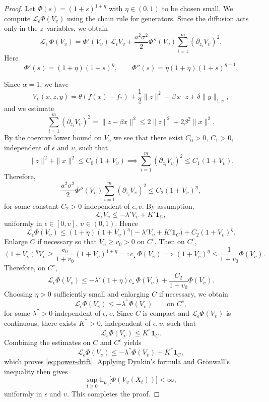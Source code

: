 \documentclass[10pt,a4paper]{amsart}
\begin{document}
\begin{proof}
Let $\Phi(s)=(1+s)^{1+\eta}$ with $\eta\in(0,1)$ to be chosen small.
We compute ${\mathcal L}_\epsilon\Phi(V_\upsilon)$ using the chain rule for generators.
Since the diffusion acts only in the $z$–variables, we obtain
\[
{\mathcal L}_\epsilon\,\Phi(V_\upsilon)
=\Phi'(V_\upsilon)\,{\mathcal L}_\epsilon V_\upsilon
+\frac{a^2\sigma^2}{2}\Phi''(V_\upsilon)
\sum_{i=1}^m(\partial_{z_i}V_\upsilon)^2 .
\]
Here
\[
\Phi'(s)=(1+\eta)(1+s)^{\eta},
\qquad
\Phi''(s)=\eta(1+\eta)(1+s)^{\eta-1}.
\]

\medskip

\noindent
Since $\alpha=1$, we have
\[
V_\upsilon(x,z,y)
= \theta(f(x)-f_\ast)
+ \frac12\|z\|^2
- \beta\, x\cdot z
+ \delta\|y\|_{1,\upsilon},
\]
and we estimate
\[
\sum_{i=1}^m(\partial_{z_i}V_\upsilon)^2
= \|z-\beta x\|^2
\le 2\|z\|^2 + 2\beta^2\|x\|^2.
\]
By the coercive lower bound on $V_\upsilon$ we see that there exist $C_0>0$, $C_1>0$, independent of $\epsilon$ and $\upsilon$,
such that
\[
\|z\|^2+\|x\|^2
\le C_0(1+V_\upsilon)\implies
\sum_{i=1}^m(\partial_{z_i}V_\upsilon)^2
\le C_1(1+V_\upsilon).
\]
Therefore,
\[
\frac{a^2\sigma^2}{2}\Phi''(V_\upsilon)
\sum_{i=1}^m(\partial_{z_i}V_\upsilon)^2
\le C_2(1+V_\upsilon)^{\eta},
\]
for some constant $C_2>0$ independent of $\epsilon,\upsilon$. By assumption,
\[
{\mathcal L}_\epsilon V_\upsilon
\le -\lambda' V_\upsilon + K'\mathbf 1_{C},
\]
uniformly in $\epsilon\in[0,\upsilon]$, $\upsilon\in(0,1)$.
Hence
\[
{\mathcal L}_\epsilon\Phi(V_\upsilon)
\le (1+\eta)(1+V_\upsilon)^{\eta}
\bigl(-\lambda' V_\upsilon + K'\mathbf 1_{C}\bigr)
+ C_2(1+V_\upsilon)^{\eta}.
\]
Enlarge $C$ if necessary so that $V_\upsilon\ge v_0>0$ on $C^c$.
Then on $C^c$,
\[
(1+V_\upsilon)^{\eta}V_\upsilon
\ge \frac{v_0}{1+v_0}(1+V_\upsilon)^{1+\eta}
=: c_\star\,\Phi(V_\upsilon)\implies
(1+V_\upsilon)^{\eta}
\le \frac{1}{1+v_0}\Phi(V_\upsilon).
\]
Therefore, on $C^c$,
\[
{\mathcal L}_\epsilon\Phi(V_\upsilon)
\le -\lambda'(1+\eta)c_\star\,\Phi(V_\upsilon)
+ \frac{C_2}{1+v_0}\Phi(V_\upsilon).
\]
Choosing $\eta>0$ sufficiently small and enlarging $C$ if necessary,
we obtain
\[
{\mathcal L}_\epsilon\Phi(V_\upsilon)
\le -\lambda^{''}\Phi(V_\upsilon)
\qquad \text{on } {C}^c,
\]
for some $\lambda^{''}>0$ independent of $\epsilon,\upsilon$. Since $C$ is compact and ${\mathcal L}_\epsilon\Phi(V_\upsilon)$
is continuous, there exists $K^{''}>0$,
independent of $\epsilon,\upsilon$, such that
\[
{\mathcal L}_\epsilon\Phi(V_\upsilon)
\le K^{''}\mathbf 1_{C}.
\]
Combining the estimates on $C$ and ${C}^c$ yields
\[
{\mathcal L}_\epsilon\Phi(V_\upsilon)
\le -\lambda^{''}\Phi(V_\upsilon)
+ K^{''}\mathbf 1_{C},
\]
which proves \eqref{eq:power-drift}. Applying Dynkin's formula and Grönwall's inequality then gives
\[
\sup_{t\ge0}
\mathbb E_{\mu_0}\bigl[\Phi(V_\upsilon(X_t))\bigr]
<\infty,
\]
uniformly in $\epsilon$ and $\upsilon$. This completes the proof.
\end{proof}
\end{document}

